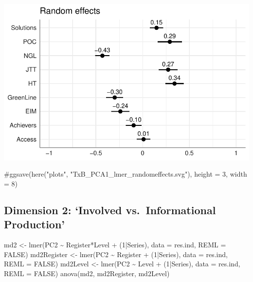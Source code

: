 \documentclass[
  letterpaper,
  DIV=11,
  numbers=noendperiod]{scrreprt}
\newenvironment{Shaded}{\begin{snugshade}}{\end{snugshade}}
\newcommand{\AttributeTok}[1]{\textcolor[rgb]{0.40,0.45,0.13}{#1}}
\newcommand{\CommentTok}[1]{\textcolor[rgb]{0.37,0.37,0.37}{#1}}
\newcommand{\ConstantTok}[1]{\textcolor[rgb]{0.56,0.35,0.01}{#1}}
\newcommand{\DecValTok}[1]{\textcolor[rgb]{0.68,0.00,0.00}{#1}}
\newcommand{\FunctionTok}[1]{\textcolor[rgb]{0.28,0.35,0.67}{#1}}
\newcommand{\NormalTok}[1]{\textcolor[rgb]{0.00,0.23,0.31}{#1}}
\newcommand{\OtherTok}[1]{\textcolor[rgb]{0.00,0.23,0.31}{#1}}
\newcommand{\SpecialCharTok}[1]{\textcolor[rgb]{0.37,0.37,0.37}{#1}}
\begin{document}
\includegraphics{AppendixF_files/figure-pdf/Dim1random-1.pdf}

\begin{Shaded}
\begin{Highlighting}[]
\CommentTok{\#ggsave(here("plots", "TxB\_PCA1\_lmer\_randomeffects.svg"), height = 3, width = 8)}
\end{Highlighting}
\end{Shaded}

\subsection{Dimension 2: `Involved vs.~Informational
Production'}\label{dimension-2-involved-vs.-informational-production}

\begin{Shaded}
\begin{Highlighting}[]
\NormalTok{md2 }\OtherTok{\textless{}{-}} \FunctionTok{lmer}\NormalTok{(PC2 }\SpecialCharTok{\textasciitilde{}}\NormalTok{ Register}\SpecialCharTok{*}\NormalTok{Level }\SpecialCharTok{+}\NormalTok{ (}\DecValTok{1}\SpecialCharTok{|}\NormalTok{Series), }\AttributeTok{data =}\NormalTok{ res.ind, }\AttributeTok{REML =} \ConstantTok{FALSE}\NormalTok{)}
\NormalTok{md2Register }\OtherTok{\textless{}{-}} \FunctionTok{lmer}\NormalTok{(PC2 }\SpecialCharTok{\textasciitilde{}}\NormalTok{ Register }\SpecialCharTok{+}\NormalTok{ (}\DecValTok{1}\SpecialCharTok{|}\NormalTok{Series), }\AttributeTok{data =}\NormalTok{ res.ind, }\AttributeTok{REML =} \ConstantTok{FALSE}\NormalTok{)}
\NormalTok{md2Level }\OtherTok{\textless{}{-}} \FunctionTok{lmer}\NormalTok{(PC2 }\SpecialCharTok{\textasciitilde{}}\NormalTok{ Level }\SpecialCharTok{+}\NormalTok{ (}\DecValTok{1}\SpecialCharTok{|}\NormalTok{Series), }\AttributeTok{data =}\NormalTok{ res.ind, }\AttributeTok{REML =} \ConstantTok{FALSE}\NormalTok{)}
\FunctionTok{anova}\NormalTok{(md2, md2Register, md2Level)}
\end{Highlighting}
\end{Shaded}
\end{document}
